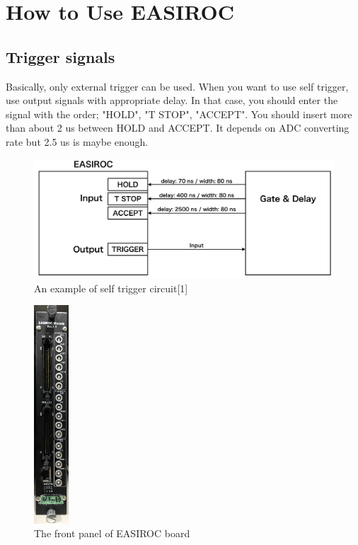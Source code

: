 
\section{How to Use EASIROC}
\subsection{Trigger signals}
Basically, only external trigger can be used. When you want to use self trigger, use output signals with appropriate delay. In that case, you should enter the signal with the order; "HOLD", "T STOP", "ACCEPT". 
You should insert more than about 2 us between HOLD and ACCEPT. It depends on ADC converting rate but 2.5 us is maybe enough.

\begin{figure}[H]
\begin{center}
\includegraphics[width = 13.0cm, bb= 0 0 899 358]{1.png}
\end{center}
\caption{An example of self trigger circuit[1]}
\label{fig:}
\end{figure}

\begin{figure}[H]
\begin{center}
\includegraphics[width = 1.3cm, bb= 0 0 588 3683]{4.jpg}
\end{center}
\caption{The front panel of EASIROC board}
\label{fig:}
\end{figure}

